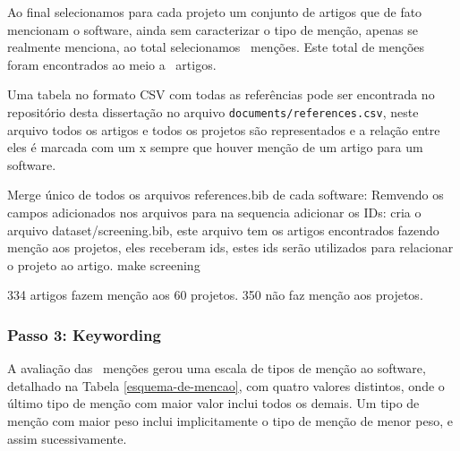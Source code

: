 Ao final selecionamos para cada projeto um conjunto de artigos que de fato
mencionam o software, ainda sem caracterizar o tipo de menção, apenas se
realmente menciona, ao total selecionamos \ScreeningCount \ menções.
Este total de menções foram encontrados ao meio a \ScreeningUniqueCount \ artigos.

Uma tabela no formato CSV com todas as referências pode ser encontrada no repositório
desta dissertação no arquivo \texttt{documents/references.csv}, neste arquivo todos
os artigos e todos os projetos são representados e a relação entre eles é marcada com
um x sempre que houver menção de um artigo para um software.

Merge único de todos os arquivos references.bib de cada software:
Remvendo os campos adicionados nos arquivos para na sequencia adicionar os IDs:
cria o arquivo dataset/screening.bib, este arquivo tem os artigos
encontrados fazendo menção aos projetos, eles receberam ids, estes
ids serão utilizados para relacionar o projeto ao artigo.
make screening

334 artigos fazem menção aos 60 projetos.
350 não faz menção aos projetos.

\subsubsection{Passo 3: Keywording}

A avaliação das \ScreeningCount \ menções gerou uma escala de tipos de menção
ao software, detalhado na Tabela \ref{esquema-de-mencao}, com quatro valores
distintos, onde o último tipo de menção com maior valor inclui todos os demais.
Um tipo de menção com maior peso inclui implicitamente o tipo de menção de
menor peso, e assim sucessivamente.

